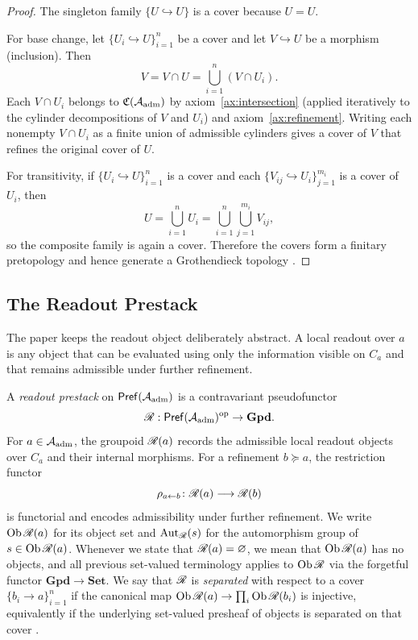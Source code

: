 \begin{proof}
The singleton family $\{U\hookrightarrow U\}$ is a cover because $U=U$.

For base change, let $\{U_i\hookrightarrow U\}_{i=1}^n$ be a cover and let
$V\hookrightarrow U$ be a morphism (inclusion).  Then
\[
V
=
V\cap U
=
\bigcup_{i=1}^n (V\cap U_i).
\]
Each $V\cap U_i$ belongs to $\mathfrak{C}(\mathcal{A}_{\mathrm{adm}})$ by
axiom~\ref{ax:intersection} (applied iteratively to the cylinder
decompositions of $V$ and $U_i$) and axiom~\ref{ax:refinement}.  Writing each
nonempty $V\cap U_i$ as a finite union of admissible cylinders gives a cover of
$V$ that refines the original cover of $U$.

For transitivity, if $\{U_i\hookrightarrow U\}_{i=1}^n$ is a cover and each
$\{V_{ij}\hookrightarrow U_i\}_{j=1}^{m_i}$ is a cover of $U_i$, then
\[
U
=
\bigcup_{i=1}^n U_i
=
\bigcup_{i=1}^n \bigcup_{j=1}^{m_i} V_{ij},
\]
so the composite family is again a cover.
Therefore the covers form a finitary pretopology and hence generate a
Grothendieck topology \cite[Proposition~III.2.2]{MacLaneMoerdijk1992}.
\end{proof}

\subsection{The Readout Prestack}

The paper keeps the readout object deliberately abstract.  A local readout over
$a$ is any object that can be evaluated using only the information visible on
$C_a$ and that remains admissible under further refinement.

\begin{definition}
\label{def:prefix-sheaf-readout}
A \emph{readout prestack} on $\mathsf{Pref}(\mathcal{A}_{\mathrm{adm}})$ is a contravariant pseudofunctor
\[
\mathscr{R}:\mathsf{Pref}(\mathcal{A}_{\mathrm{adm}})^{\mathrm{op}}\to \mathbf{Gpd}.
\]
For $a\in\mathcal{A}_{\mathrm{adm}}$, the groupoid $\mathscr{R}(a)$ records the admissible local readout
objects over $C_a$ and their internal morphisms.  For a refinement $b\succeq a$,
the restriction functor
\[
\rho_{a\leftarrow b}\colon \mathscr{R}(a)\longrightarrow \mathscr{R}(b)
\]
is functorial and encodes admissibility under further refinement.  We write
$\operatorname{Ob}\mathscr{R}(a)$ for its object set and $\operatorname{Aut}_{\mathscr{R}}(s)$ for the automorphism
group of $s\in\operatorname{Ob}\mathscr{R}(a)$.  Whenever we state that $\mathscr{R}(a)=\varnothing$, we
mean that $\operatorname{Ob}\mathscr{R}(a)$ has no objects, and all previous set-valued terminology
applies to $\operatorname{Ob}\mathscr{R}$ via the forgetful functor $\mathbf{Gpd}\to\mathbf{Set}$.
We say that $\mathscr{R}$ is \emph{separated} with respect to a cover
$\{b_i\to a\}_{i=1}^n$ if the canonical map
$\operatorname{Ob}\mathscr{R}(a)\to\prod_i\operatorname{Ob}\mathscr{R}(b_i)$ is injective, equivalently if the
underlying set-valued presheaf of objects is separated on that cover
\cite[\S II.1]{MacLaneMoerdijk1992}.
\end{definition}

